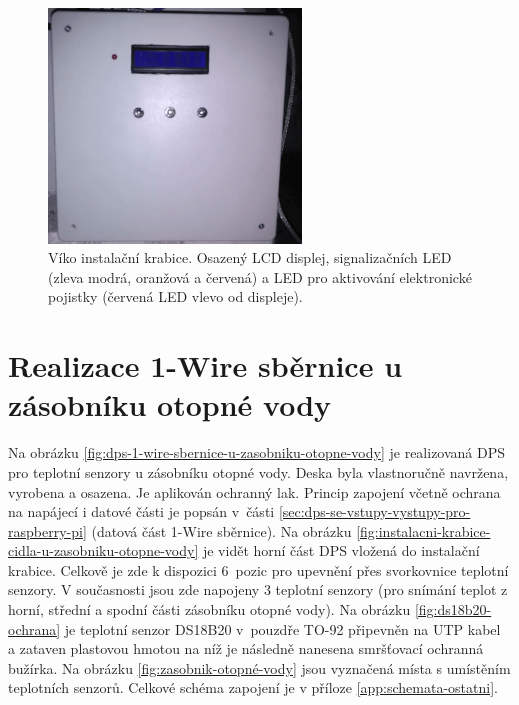 \begin{figure}[H]
    \centering
    \includegraphics[width=0.6\textwidth]{images/krb/predni-cast-krytu-vika-instalacni-krabice-krb.png}
    \caption[Víko instalační krabice.]{Víko instalační krabice. Osazený LCD displej, signalizačních LED (zleva modrá, oranžová a červená) a LED pro aktivování elektronické pojistky (červená LED vlevo od displeje).}
    \label{fig:predni-cast-krytu-vika-instalacni-krabice-krb}
\end{figure}


\section{Realizace 1-Wire sběrnice u zásobníku otopné vody}
Na obrázku \ref{fig:dps-1-wire-sbernice-u-zasobniku-otopne-vody} je realizovaná DPS pro teplotní senzory u zásobníku otopné vody. Deska byla vlastnoručně navržena, vyrobena a osazena. Je aplikován ochranný lak. Princip zapojení včetně ochrana na napájecí i datové části je popsán v~části \ref{sec:dps-se-vstupy-vystupy-pro-raspberry-pi} (datová část 1-Wire sběrnice). Na obrázku \ref{fig:instalacni-krabice-cidla-u-zasobniku-otopne-vody} je vidět horní část DPS vložená do instalační krabice. Celkově je zde k dispozici 6~pozic pro upevnění přes svorkovnice teplotní senzory. V současnosti jsou zde napojeny 3 teplotní senzory (pro snímání teplot z horní, střední a spodní části zásobníku otopné vody). Na obrázku \ref{fig:ds18b20-ochrana} je teplotní senzor DS18B20 v~pouzdře TO-92 připevněn na UTP kabel a zataven plastovou hmotou na níž je následně nanesena smršťovací ochranná bužírka. Na obrázku \ref{fig:zasobnik-otopné-vody} jsou vyznačená místa s umístěním teplotních senzorů. Celkové schéma zapojení je v příloze \ref{app:schemata-ostatni}.

